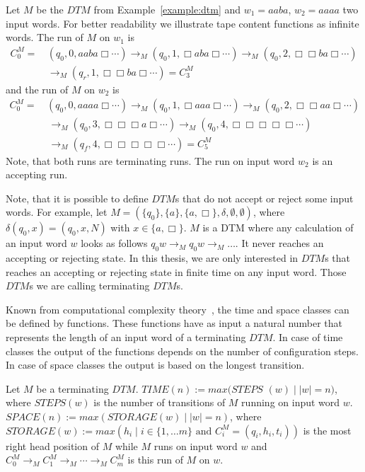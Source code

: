 \begin{example}
    \label{example:run_of_dtm}
    Let $M$ be the $\mathit{DTM}$ from Example~\ref{example:dtm} and $w_1 = aaba$, $w_2 = aaaa$ two input words. For
    better readability we illustrate tape content functions as infinite words. The run of $M$ on $w_1$ is
    \begin{align*}
        C_0^M = &\,(q_0, 0, aaba\Box \dotsb) \rightarrow_M (q_0, 1, \Box aba\Box \dotsb) \rightarrow_M  (q_0, 2, \Box \Box
        ba\Box \dotsb)\\&\, \rightarrow_M (q_r, 1, \Box \Box ba\Box \dotsb) = C_3^M
    \end{align*}
    and the run of $M$ on $w_2$ is
    \begin{align*}
        C_0^M =\,&(q_0, 0, aaaa\Box \dotsb) \rightarrow_M (q_0, 1, \Box aaa\Box \dotsb) \rightarrow_M (q_0, 2, \Box \Box
        aa\Box \dotsb) \\&\,\rightarrow_M
        (q_0, 3, \Box \Box \Box a\Box \dotsb) \rightarrow_M (q_0, 4, \Box \Box \Box \Box \Box \dotsb) \\&\,\rightarrow_M
        (q_f, 4, \Box \Box \Box \Box \Box \dotsb) = C_5^M
    \end{align*}
    Note, that both runs are terminating runs. The run on input word $w_2$ is an accepting run.
\end{example}

Note, that it is possible to define $\mathit{DTM}$s that do not accept or reject some input words. For example, let
$M = (\{q_0\}, \{a\}, \{a, \Box\}, \delta, \emptyset, \emptyset)$, where $\delta(q_0, x) = (q_0, x, N)$ with $x \in
\{a, \Box\}$. $M$ is a DTM where any calculation of an input word $w$ looks as follows $q_0w \rightarrow_M q_0w
\rightarrow_M \dots$. It never reaches an accepting or rejecting state. In this thesis, we are only interested in
$\mathit{DTM}$s that reaches an accepting or rejecting state in finite time on any input word. Those $\mathit{DTM}$s
we are calling terminating $\mathit{DTM}$s.

Known from computational complexity theory~\cite{papadimitriou1994complexity}, the time and space classes
can be defined by functions. These functions have as input a natural number that represents the length of an input
word of a terminating $\mathit{DTM}$. In case of time classes the output of the functions depends on the number of
configuration steps. In case of space classes the output is based on the longest transition.

\begin{definition}
    Let $M$ be a terminating $\mathit{DTM}$. $\mathit{TIME}(n):= max(\mathit{STEPS}$ $(w)\mid |w| = n)$, where
    $\mathit{STEPS}(w)$ is the number of transitions of $M$ running on input word $w$. $\mathit{SPACE}(n) := max
    (\mathit{STORAGE}(w)\mid |w| = n)$, where $\mathit{STORAGE}(w) := max(h_i\mid i\in\{1, \dots m\} \text{ and }
    C_i^M = (q_i, h_i, t_i))$ is the most right head position of $M$ while $M$ runs on input word $w$ and $C_0^M
    \rightarrow_M
    C_1^M \rightarrow_M \dotsb \rightarrow_M C_m^M$ is this run of $M$ on $w$.
\end{definition}

